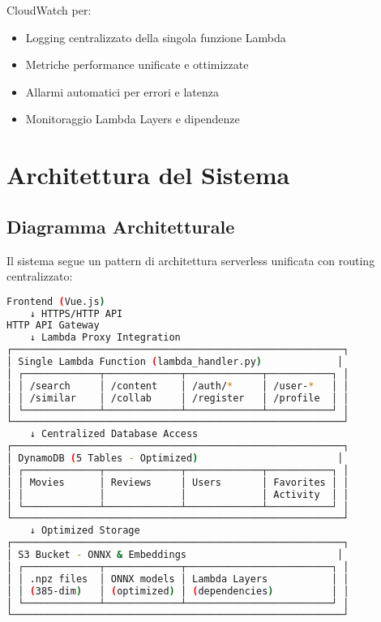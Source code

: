 \documentclass[11pt,a4paper]{article}
\begin{document}
\begin{description}[style=nextline, leftmargin=0cm, itemsep=0.5em]
  \item[Monitoring \& Observability Unificato] CloudWatch per:
    \begin{itemize}
      \item Logging centralizzato della singola funzione Lambda
      \item Metriche performance unificate e ottimizzate
      \item Allarmi automatici per errori e latenza
      \item Monitoraggio Lambda Layers e dipendenze
    \end{itemize}
\end{description}

\section{Architettura del Sistema}

\subsection{Diagramma Architetturale}
Il sistema segue un pattern di architettura serverless unificata con routing centralizzato:

\begin{lstlisting}[language=bash, caption=Flusso di Comunicazione del Sistema]
Frontend (Vue.js) 
    ↓ HTTPS/HTTP API
HTTP API Gateway 
    ↓ Lambda Proxy Integration
┌─────────────────────────────────────────────────────────┐
│ Single Lambda Function (lambda_handler.py)             │
│ ┌─────────────┬─────────────┬─────────────┬───────────┐ │
│ │ /search     │ /content    │ /auth/*     │ /user-*   │ │
│ │ /similar    │ /collab     │ /register   │ /profile  │ │
│ └─────────────┴─────────────┴─────────────┴───────────┘ │
└─────────────────────────────────────────────────────────┘
    ↓ Centralized Database Access
┌─────────────────────────────────────────────────────────┐
│ DynamoDB (5 Tables - Optimized)                        │
│ ┌─────────────┬─────────────┬─────────────┬───────────┐ │
│ │ Movies      │ Reviews     │ Users       │ Favorites │ │
│ │             │             │             │ Activity  │ │
│ └─────────────┴─────────────┴─────────────┴───────────┘ │
└─────────────────────────────────────────────────────────┘
    ↓ Optimized Storage
┌─────────────────────────────────────────────────────────┐
│ S3 Bucket - ONNX & Embeddings                          │
│ ┌─────────────┬─────────────┬─────────────────────────┐ │
│ │ .npz files  │ ONNX models │ Lambda Layers           │ │
│ │ (385-dim)   │ (optimized) │ (dependencies)          │ │
│ └─────────────┴─────────────┴─────────────────────────┘ │
└─────────────────────────────────────────────────────────┘
\end{lstlisting}
\end{document}
